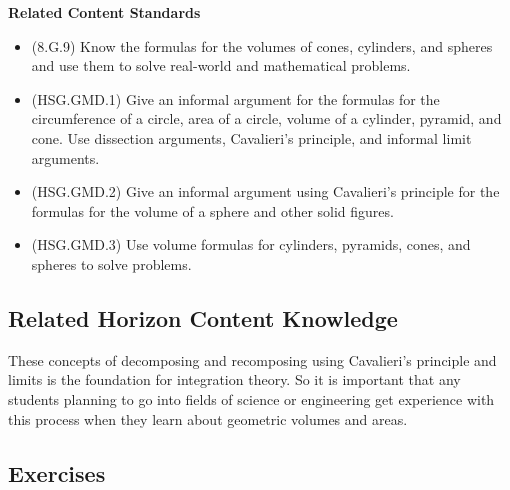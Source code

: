\documentclass[
]{book}
\providecommand{\tightlist}{%
  \setlength{\itemsep}{0pt}\setlength{\parskip}{0pt}}
\newenvironment{standards}{}{}
\theoremstyle{definition}
\theoremstyle{definition}
\theoremstyle{definition}
\theoremstyle{definition}
\theoremstyle{remark}
\begin{document}
\begin{standards}

\begin{center}
\textbf{Related Content Standards}

\end{center}

\begin{itemize}
\tightlist
\item
  (8.G.9) Know the formulas for the volumes of cones, cylinders, and spheres and use them to solve real-world and mathematical problems.
\item
  (HSG.GMD.1) Give an informal argument for the formulas for the circumference of a circle, area of a circle, volume of a cylinder, pyramid, and cone. Use dissection arguments, Cavalieri's principle, and informal limit arguments.
\item
  (HSG.GMD.2) Give an informal argument using Cavalieri's principle for the formulas for the volume of a sphere and other solid figures.
\item
  (HSG.GMD.3) Use volume formulas for cylinders, pyramids, cones, and spheres to solve problems.
\end{itemize}

\end{standards}

\hypertarget{related-horizon-content-knowledge}{%
\subsection{Related Horizon Content Knowledge}\label{related-horizon-content-knowledge}}

These concepts of decomposing and recomposing using Cavalieri's principle and limits is the foundation for integration theory. So it is important that any students planning to go into fields of science or engineering get experience with this process when they learn about geometric volumes and areas.

\hypertarget{exercises-45}{%
\subsection{Exercises}\label{exercises-45}}
\end{document}
